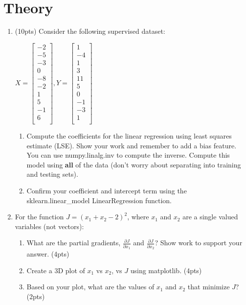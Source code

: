 \documentclass[12pt]{article}
\begin{document}
\section{Theory}
\begin{enumerate}
\item   (10pts) Consider the following supervised dataset:\\
\begin{center}
$X=
 \begin{bmatrix}
	-2\\
	-5\\	
	-3\\
	0\\
	-8\\
	-2\\
	1\\
	5\\
	-1\\
	6\\
\end{bmatrix},
Y=
 \begin{bmatrix}
	1\\
	-4\\	
	1\\
	3\\
	11\\
	5\\
	0\\
	-1\\
	-3\\
	1\\
\end{bmatrix}
$
\end{center}
	\begin{enumerate}
	\item Compute the coefficients for the linear regression using least squares estimate (LSE).  Show your work and remember to add a bias feature.  You can use numpy.linalg.inv to compute the inverse.  Compute this model using \textbf{all} of the data (don't worry about separating into training and testing sets).\\
	\item Confirm your coefficient and intercept term using the sklearn.linear\_model LinearRegression function.  
	\end{enumerate}
	
\item For the function $J=(x_1+x_2-2)^2$, where $x_1$ and $x_2$ are a single valued variables (not vectors):
\begin{enumerate}
\item What are the partial gradients, $\frac{\partial J}{\partial x_1}$ and $\frac{\partial J}{\partial x_2}$?  Show work to support your answer. (4pts)
\item Create a 3D plot of  $x_1$ vs $x_2$, vs $J$ using matplotlib. (4pts)
\item Based on your plot, what are the values of $x_1$ and $x_2$ that minimize $J$? (2pts)
\end{enumerate}

\end{enumerate}
\end{document}
